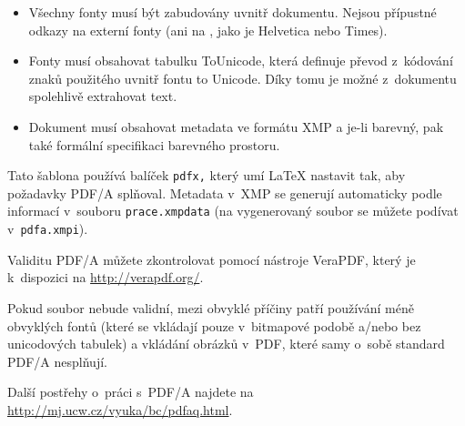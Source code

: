 \begin{itemize}

      \item Všechny fonty musí být zabudovány uvnitř dokumentu. Nejsou přípustné
            odkazy na externí fonty (ani na , jako je Helvetica nebo Times).

      \item Fonty musí obsahovat tabulku ToUnicode, která definuje převod z~kódování
            znaků použitého uvnitř fontu to Unicode. Díky tomu je možné z~dokumentu
            spolehlivě extrahovat text.

      \item Dokument musí obsahovat metadata ve formátu XMP a je-li barevný,
            pak také formální specifikaci barevného prostoru.

\end{itemize}

Tato šablona používá balíček {\tt pdfx,} který umí \LaTeX{} nastavit tak,
aby požadavky PDF/A splňoval. Metadata v~XMP se generují automaticky podle
informací v~souboru {\tt prace.xmpdata} (na vygenerovaný soubor se můžete
podívat v~{\tt pdfa.xmpi}).

Validitu PDF/A můžete zkontrolovat pomocí nástroje VeraPDF, který je
k~dispozici na \url{http://verapdf.org/}.

Pokud soubor nebude validní, mezi obvyklé příčiny patří používání méně
obvyklých fontů (které se vkládají pouze v~bitmapové podobě a/nebo bez
unicodových tabulek) a vkládání obrázků v~PDF, které samy o~sobě standard
PDF/A nesplňují.

Další postřehy o~práci s~PDF/A najdete na \url{http://mj.ucw.cz/vyuka/bc/pdfaq.html}.
